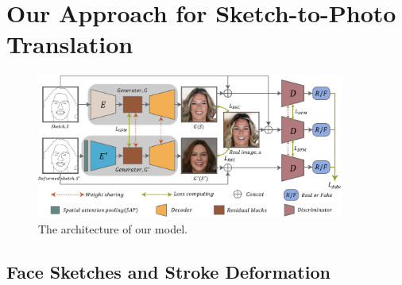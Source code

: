 
\section{Our Approach for Sketch-to-Photo Translation}
\label{sec:network}

\begin{figure}
	\includegraphics[width=0.9\textwidth]{figs/architecture}
	\caption{The architecture of our model.}
	\label{fig:architecture}
\end{figure}
%

%



\subsection{Face Sketches and Stroke Deformation}
\label{subsec:algorithm_data}



